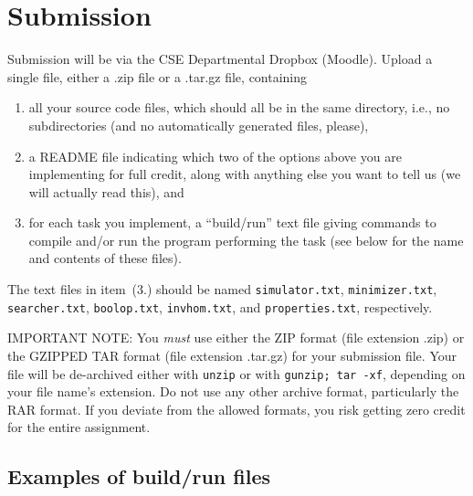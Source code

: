 \section*{Submission}

Submission will be via the CSE Departmental Dropbox (Moodle).
Upload a single file, either a .zip file or a .tar.gz file, containing
\begin{enumerate}
\item
all your source code files, which should all be in the same directory,
i.e., no subdirectories (and no automatically generated files, please),

\item
a README file indicating which two of the options above you are
implementing for full credit, along with anything else you want to
tell us (we will actually read this), and

\item
for each task you implement, a ``build/run'' text file giving commands to
compile and/or run the program performing the task (see below for the
name and contents of these files).

\end{enumerate}

The text files in item~(3.) should be named
\texttt{simulator.txt},
\texttt{minimizer.txt},
\texttt{searcher.txt},
\texttt{boolop.txt},
\texttt{invhom.txt},
and \texttt{properties.txt},
respectively.

IMPORTANT NOTE:
You \emph{must} use either the ZIP format (file extension .zip) or the
GZIPPED TAR format (file extension .tar.gz) for your submission file.
Your file will be de-archived either with \texttt{unzip} or
with \texttt{gunzip; tar -xf}, depending on your file name's extension.
Do not use any other archive format, particularly the RAR format.
If you deviate from the allowed formats, you risk getting zero credit for the entire assignment.

\subsection*{Examples of build/run files}

